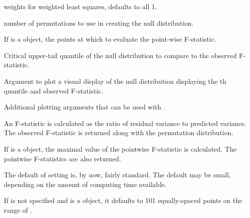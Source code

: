 \begin{Arguments}
\begin{ldescription}
\item[\code{wt}] weights for weighted least squares, defaults to all 1.

\item[\code{nperm}] number of permutations to use in creating the null distribution.

\item[\code{argvals}] If  is a  object, the points at which to evaluate
the point-wise F-statistic.

\item[\code{q}] Critical upper-tail quantile of the null distribution to compare to the observed F-statistic.

\item[\code{plotres}] Argument to plot a visual display of the null distribution displaying the
th quantile and observed F-statistic.

\item[\code{...}] Additional plotting arguments that can be used with .

\end{ldescription}
\end{Arguments}
\begin{Details}\relax
An F-statistic is calculated as the ratio of residual variance to predicted
variance. The observed F-statistic is returned along with the permutation
distribution.

If  is a  object, the maximal value of the pointwise
F-statistic is calculated. The pointwise F-statistics are also returned.

The default of setting  is, by now, fairly standard. The default
 may be small, depending on the amount of computing time available.

If  is not specified and  is a  object,
it defaults to 101 equally-spaced points on the range of .
\end{Details}
